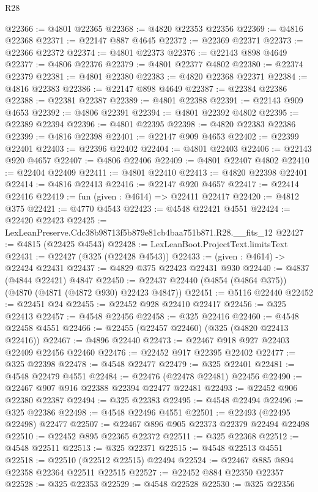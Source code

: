 \begin{lexlean}{R28}
\begin{coremodule}
@22366 := @4801 @22365
@22368 := @4820 @22353 @22356
@22369 := @4816 @22368
@22371 := @22147 @887 @4645
@22372 := @22369 @22371
@22373 := @22366 @22372
@22374 := @4801 @22373
@22376 := @22143 @898 @4649
@22377 := @4806 @22376
@22379 := @4801 @22377 @4802
@22380 := @22374 @22379
@22381 := @4801 @22380
@22383 := @4820 @22368 @22371
@22384 := @4816 @22383
@22386 := @22147 @898 @4649
@22387 := @22384 @22386
@22388 := @22381 @22387
@22389 := @4801 @22388
@22391 := @22143 @909 @4653
@22392 := @4806 @22391
@22394 := @4801 @22392 @4802
@22395 := @22389 @22394
@22396 := @4801 @22395
@22398 := @4820 @22383 @22386
@22399 := @4816 @22398
@22401 := @22147 @909 @4653
@22402 := @22399 @22401
@22403 := @22396 @22402
@22404 := @4801 @22403
@22406 := @22143 @920 @4657
@22407 := @4806 @22406
@22409 := @4801 @22407 @4802
@22410 := @22404 @22409
@22411 := @4801 @22410
@22413 := @4820 @22398 @22401
@22414 := @4816 @22413
@22416 := @22147 @920 @4657
@22417 := @22414 @22416
@22419 := fun (given : @4614) => @22411 @22417
@22420 := @4812 @375
@22421 := @4770 @4543
@22423 := @4548 @22421 @4551
@22424 := @22420 @22423
@22425 := LexLeanPreserve.Cdc38b98713f5b879e81cb4baa751b871.R28.__fits_12
@22427 := @4815 (@22425 @4543)
@22428 := LexLeanBoot.ProjectText.limitsText
@22431 := @22427 (@325 (@22428 @4543))
@22433 := (given : @4614) -> @22424 @22431
@22437 := @4829 @375 @22423 @22431 @930
@22440 := @4837 (@4844 @22421) @4847
@22450 := @22437 @22440 (@4854 (@4864 @375)) (@4870 (@4871 (@4872 @930) @22423 @4847))
@22451 := @5116 @22440
@22452 := @22451 @24
@22455 := @22452 @928 @22410 @22417
@22456 := @325 @22413
@22457 := @4548 @22456
@22458 := @325 @22416
@22460 := @4548 @22458 @4551
@22466 := @22455 (@22457 @22460) (@325 (@4820 @22413 @22416))
@22467 := @4896 @22440
@22473 := @22467 @918 @927 @22403 @22409 @22456 @22460
@22476 := @22452 @917 @22395 @22402
@22477 := @325 @22398
@22478 := @4548 @22477
@22479 := @325 @22401
@22481 := @4548 @22479 @4551
@22484 := @22476 (@22478 @22481) @22456
@22490 := @22467 @907 @916 @22388 @22394 @22477 @22481
@22493 := @22452 @906 @22380 @22387
@22494 := @325 @22383
@22495 := @4548 @22494
@22496 := @325 @22386
@22498 := @4548 @22496 @4551
@22501 := @22493 (@22495 @22498) @22477
@22507 := @22467 @896 @905 @22373 @22379 @22494 @22498
@22510 := @22452 @895 @22365 @22372
@22511 := @325 @22368
@22512 := @4548 @22511
@22513 := @325 @22371
@22515 := @4548 @22513 @4551
@22518 := @22510 (@22512 @22515) @22494
@22524 := @22467 @885 @894 @22358 @22364 @22511 @22515
@22527 := @22452 @884 @22350 @22357
@22528 := @325 @22353
@22529 := @4548 @22528
@22530 := @325 @22356

\end{coremodule}
\end{lexlean}
